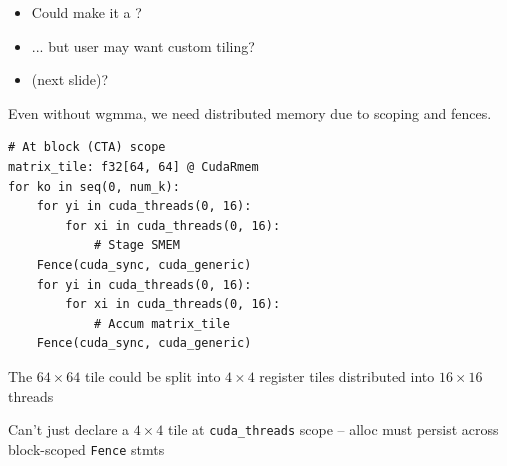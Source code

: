 \begin{minipage}[t]{0.48\textwidth}\fixminipage
\begin{itemize}
  \item Could make it a ?
  \item ... but user may want custom tiling?
  \item {} (next slide)?
\end{itemize}


Even without wgmma, we need distributed memory due to scoping and fences.

\begin{verbatim}
# At block (CTA) scope
matrix_tile: f32[64, 64] @ CudaRmem
for ko in seq(0, num_k):
    for yi in cuda_threads(0, 16):
        for xi in cuda_threads(0, 16):
            # Stage SMEM
    Fence(cuda_sync, cuda_generic)
    for yi in cuda_threads(0, 16):
        for xi in cuda_threads(0, 16):
            # Accum matrix_tile
    Fence(cuda_sync, cuda_generic)
\end{verbatim}

The $64 \times 64$ tile could be split into $4 \times 4$ register tiles distributed into $16 \times 16$ threads

Can't just declare a $4 \times 4$ tile at \texttt{cuda\_threads} scope -- alloc must persist across block-scoped \texttt{Fence} stmts
\end{minipage}

\newpage
{}


